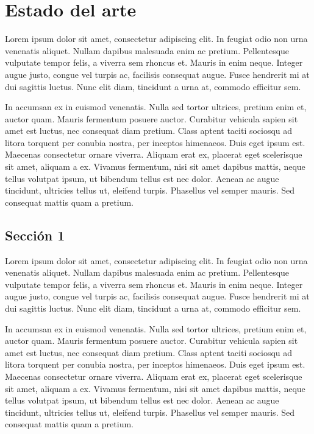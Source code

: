 \documentclass[letterpaper,twoside,10pt]{report}
\begin{document}
\chapter{Estado del arte}\label{estadoArte}

Lorem ipsum dolor sit amet, consectetur adipiscing elit. In feugiat odio non urna venenatis aliquet. Nullam dapibus malesuada enim ac pretium. Pellentesque vulputate tempor felis, a viverra sem rhoncus et. Mauris in enim neque. Integer augue justo, congue vel turpis ac, facilisis consequat augue. Fusce hendrerit mi at dui sagittis luctus. Nunc elit diam, tincidunt a urna at, commodo efficitur sem.

In accumsan ex in euismod venenatis. Nulla sed tortor ultrices, pretium enim et, auctor quam. Mauris fermentum posuere auctor. Curabitur vehicula sapien sit amet est luctus, nec consequat diam pretium. Class aptent taciti sociosqu ad litora torquent per conubia nostra, per inceptos himenaeos. Duis eget ipsum est. Maecenas consectetur ornare viverra. Aliquam erat ex, placerat eget scelerisque sit amet, aliquam a ex. Vivamus fermentum, nisi sit amet dapibus mattis, neque tellus volutpat ipsum, ut bibendum tellus est nec dolor. Aenean ac augue tincidunt, ultricies tellus ut, eleifend turpis. Phasellus vel semper mauris. Sed consequat mattis quam a pretium.

\section{Sección 1}\label{Seccion1}

Lorem ipsum dolor sit amet, consectetur adipiscing elit. In feugiat odio non urna venenatis aliquet. Nullam dapibus malesuada enim ac pretium. Pellentesque vulputate tempor felis, a viverra sem rhoncus et. Mauris in enim neque. Integer augue justo, congue vel turpis ac, facilisis consequat augue. Fusce hendrerit mi at dui sagittis luctus. Nunc elit diam, tincidunt a urna at, commodo efficitur sem.

In accumsan ex in euismod venenatis. Nulla sed tortor ultrices, pretium enim et, auctor quam. Mauris fermentum posuere auctor. Curabitur vehicula sapien sit amet est luctus, nec consequat diam pretium. Class aptent taciti sociosqu ad litora torquent per conubia nostra, per inceptos himenaeos. Duis eget ipsum est. Maecenas consectetur ornare viverra. Aliquam erat ex, placerat eget scelerisque sit amet, aliquam a ex. Vivamus fermentum, nisi sit amet dapibus mattis, neque tellus volutpat ipsum, ut bibendum tellus est nec dolor. Aenean ac augue tincidunt, ultricies tellus ut, eleifend turpis. Phasellus vel semper mauris. Sed consequat mattis quam a pretium.
\end{document}
